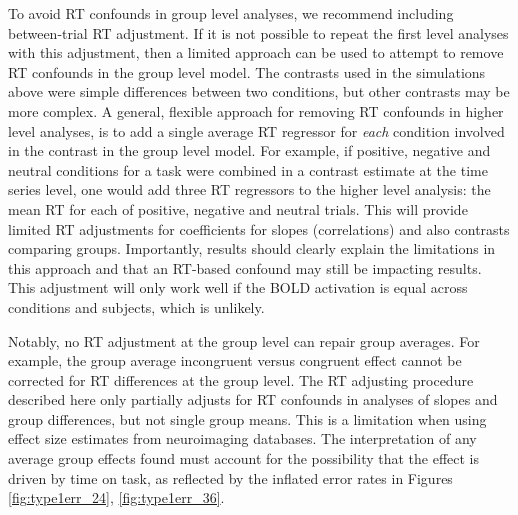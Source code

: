 \documentclass[titlepage,12pt] {article}
\begin{document}
To avoid RT confounds in group level analyses, we recommend including between-trial RT adjustment.  If it is not possible to repeat the first level analyses with this adjustment, then a limited approach can be used to attempt to remove RT confounds in the group level model.  The contrasts used in the simulations above were simple differences between two conditions, but other contrasts may be more complex.  A general, flexible approach for removing RT confounds in higher level analyses, is to  add a single average RT regressor for \emph{each} condition involved in the contrast in the group level model.  For example, if positive, negative and neutral conditions for a task were combined in a contrast estimate at the time series level, one would add three RT regressors to the higher level analysis: the mean RT for each of positive, negative and neutral trials.  This will provide limited RT adjustments for coefficients for slopes (correlations) and also contrasts comparing groups.  Importantly, results should clearly explain the limitations in this approach and that an RT-based confound may still be impacting results. This adjustment will only work well if the BOLD activation is equal across conditions and subjects, which is unlikely.

Notably, no RT adjustment at the group level can repair group averages. For example, the group average incongruent versus congruent effect cannot be corrected for RT differences at the group level. The RT adjusting procedure described here only partially adjusts for RT confounds in analyses of slopes and group differences, but not single group means. This is a limitation when using effect size estimates from neuroimaging databases. The interpretation of any average group effects found must account for the possibility that the effect is driven by time on task, as reflected by the inflated error rates in Figures \ref{fig:type1err_24}, \ref{fig:type1err_36}.

 
\end{document}
